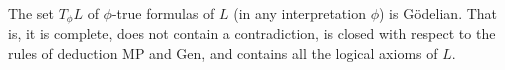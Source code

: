 The set $T_\phi L$ of $\phi$-true formulas of $L$ (in any interpretation $\phi$) is Gödelian. That is, it is complete, does not contain a contradiction, is closed with respect to the rules of deduction MP and Gen, and contains all the logical axioms of $L$.
